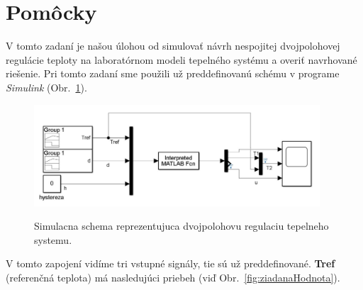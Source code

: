 \documentclass{article}
\begin{document}
\clearpage

\section{Pomôcky}
\label{sec:pomocky}

V tomto zadaní je našou úlohou od simulovať návrh nespojitej dvojpolohovej regulácie teploty na laboratórnom
modeli tepelného systému a overiť navrhované riešenie. Pri tomto zadaní sme použili už preddefinovanú schému
v programe \textit{Simulink} (Obr.~\ref{fig:schema}).

\begin{figure}[!htbp]
	\begin{center}
		\includegraphics[width=0.95\textwidth]{./include/schema.png}
		\label{fig:schema}
		\caption{Simulacna schema reprezentujuca dvojpolohovu regulaciu tepelneho systemu.}
	\end{center}
\end{figure}

V tomto zapojení vidíme tri vstupné signály, tie sú už preddefinované. \textbf{Tref} (referenčná teplota)
má nasledujúci priebeh (viď Obr.~\ref{fig:ziadanaHodnota}).
\end{document}

